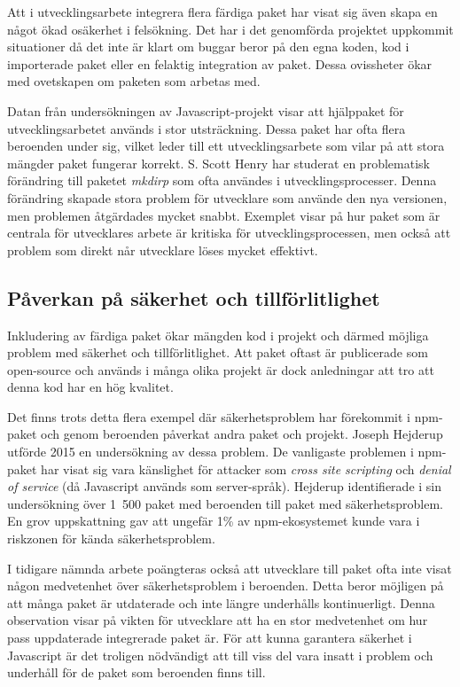 Att i utvecklingsarbete integrera flera färdiga paket har visat sig även skapa en något ökad osäkerhet i felsökning. Det har i det genomförda projektet uppkommit situationer då det inte är klart om buggar beror på den egna koden, kod i importerade paket eller en felaktig integration av paket. Dessa ovissheter ökar med ovetskapen om paketen som arbetas med.

Datan från undersökningen av Javascript-projekt visar att hjälppaket för utvecklingsarbetet används i stor utsträckning. Dessa paket har ofta flera beroenden under sig, vilket leder till ett utvecklingsarbete som vilar på att stora mängder paket fungerar korrekt. S. Scott Henry har studerat en problematisk förändring till paketet \textit{mkdirp} som ofta användes i utvecklingsprocesser.\cite{Henry2017} Denna förändring skapade stora problem för utvecklare som använde den nya versionen, men problemen åtgärdades mycket snabbt. Exemplet visar på hur paket som är centrala för utvecklares arbete är kritiska för utvecklingsprocessen, men också att problem som direkt når utvecklare löses mycket effektivt.

\subsection{Påverkan på säkerhet och tillförlitlighet}
Inkludering av färdiga paket ökar mängden kod i projekt och därmed möjliga problem med säkerhet och tillförlitlighet. Att paket oftast är publicerade som open-source och används i många olika projekt är dock anledningar att tro att denna kod har en hög kvalitet.\cite{coverity-scan2013}

Det finns trots detta flera exempel där säkerhetsproblem har förekommit i npm-paket och genom beroenden påverkat andra paket och projekt. Joseph Hejderup utförde 2015 en undersökning av dessa problem.\cite{Hejderup2017} De vanligaste problemen i npm-paket har visat sig vara känslighet för attacker som \textit{cross site scripting} och \textit{denial of service} (då Javascript används som server-språk). Hejderup identifierade i sin undersökning över 1~500 paket med beroenden till paket med säkerhetsproblem. En grov uppskattning gav att ungefär 1\% av npm-ekosystemet kunde vara i riskzonen för kända säkerhetsproblem.

I tidigare nämnda arbete poängteras också att utvecklare till paket ofta inte visat någon medvetenhet över säkerhetsproblem i beroenden. Detta beror möjligen på att många paket är utdaterade och inte längre underhålls kontinuerligt. Denna observation visar på vikten för utvecklare att ha en stor medvetenhet om hur pass uppdaterade integrerade paket är. För att kunna garantera säkerhet i Javascript är det troligen nödvändigt att till viss del vara insatt i problem och underhåll för de paket som beroenden finns till.

